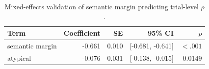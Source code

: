 \begin{table}[htbp]
\centering
\caption{Mixed-effects validation of semantic margin predicting trial-level $\rho$.}
\label{tab:mixed-effects}
\begin{tabular}{l r r r r}
\toprule
Term & Coefficient & SE & 95\% CI & $p$ \\
\midrule
semantic margin & -0.661 & 0.010 & [-0.681, -0.641] & $<.001$ \\
atypical & -0.076 & 0.031 & [-0.138, -0.015] & 0.0149 \\
\bottomrule
\end{tabular}
\end{table}
